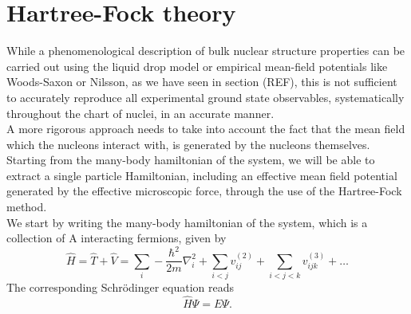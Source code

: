 \section{Hartree-Fock theory}
While a phenomenological description of bulk nuclear structure properties can be carried out using the liquid drop model or empirical mean-field potentials like Woods-Saxon or Nilsson, as we have seen in section (REF), this is not sufficient to accurately reproduce all experimental ground state observables, systematically throughout the chart of nuclei, in an accurate manner. 
\\A more rigorous approach needs to take into account the fact that the mean field which the nucleons interact with, is generated by the nucleons themselves.
Starting from the many-body hamiltonian of the system, we will be able to extract a single particle Hamiltonian, including an effective mean field potential generated by the effective microscopic force, through the use of the Hartree-Fock method.
\\We start by writing the many-body hamiltonian of the system, which is a collection of A interacting fermions, given by
\begin{equation}
    \label{eq:mb_hamiltonian}
    \hat H = \hat T + \hat V = \sum_i -\frac{\hbar^2}{2m}\nabla^2_i + \sum_{i<j} v^{(2)}_{ij} + \sum_{i<j<k} v^{(3)}_{ijk }+\ldots
\end{equation}
The corresponding Schr\"odinger equation reads
\begin{equation}
    \label{eq:many_body_schrodinger}
    \hat H \Psi = E\Psi.
\end{equation}
